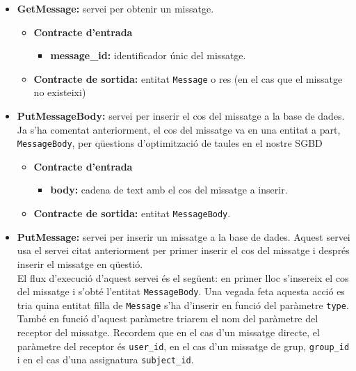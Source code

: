 		\begin{itemize}
			
			\item \textbf{GetMessage:} servei per obtenir un missatge.
			
			\begin{itemize}
					\item \textbf{Contracte d'entrada}
						\begin{itemize}
							\item \textbf{message\_id:} identificador únic del missatge.
						\end{itemize}
					\item \textbf{Contracte de sortida:} entitat \texttt{Message} o res (en el cas que el missatge no existeixi)
			\end{itemize}
				
							
			\item \textbf{PutMessageBody:} servei per inserir el cos del missatge a la base de dades. Ja s'ha comentat anteriorment, el cos del missatge va en una entitat a part, \texttt{MessageBody}, per qüestions d'optimització de taules en el nostre \ac{SGBD}
			
			\begin{itemize}
					\item \textbf{Contracte d'entrada}
						\begin{itemize}
							\item \textbf{body:} cadena de text amb el cos del missatge a inserir.
						\end{itemize}
					\item \textbf{Contracte de sortida:} entitat \texttt{MessageBody}.
			\end{itemize}

			\item \textbf{PutMessage:} servei per inserir un missatge a la base de dades. Aquest servei usa el servei citat anteriorment per primer inserir el cos del missatge i després inserir el missatge en qüestió.\\
			
			El flux d'execució d'aquest servei és el següent: en primer lloc s'insereix el cos del missatge i s'obté l'entitat \texttt{MessageBody}. Una vegada feta aquesta acció es tria quina entitat filla de \texttt{Message} s'ha d'inserir en funció del paràmetre \texttt{type}. \\
			
			També en funció d'aquest paràmetre triarem el nom del paràmetre del receptor del missatge. Recordem que en el cas d'un missatge directe, el paràmetre del receptor és \texttt{user\_id}, en el cas d'un missatge de grup, \texttt{group\_id} i en el cas d'una assignatura \texttt{subject\_id}.\\
			

\end{itemize}
